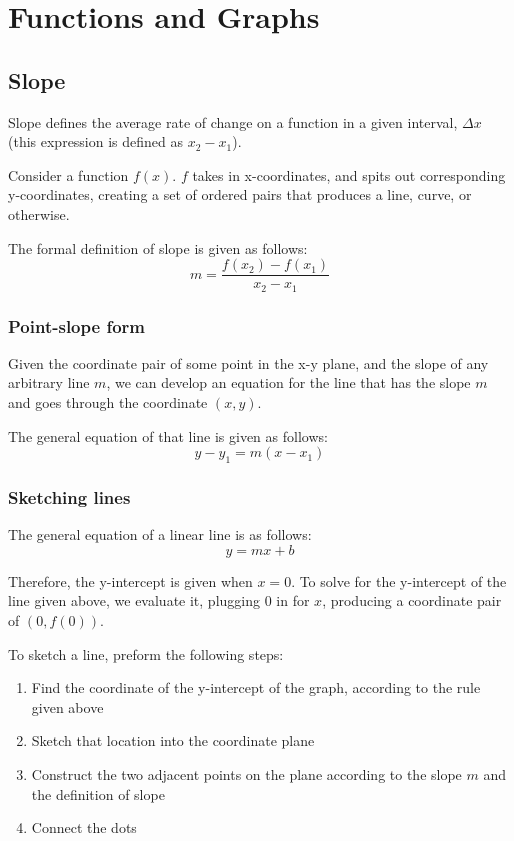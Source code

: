 \chapter{Functions and Graphs}

\section{Slope}
Slope defines the average rate of change on a function in a given interval,
\(\Delta x\) (this expression is defined as $x_2-x_1$).

Consider a function $f(x)$.  $f$ takes in x-coordinates, and spits out
corresponding y-coordinates, creating a set of ordered pairs that produces a
line, curve, or otherwise.

The formal definition of slope is given as follows:
\begin{equation}
m=\frac{f(x_2)-f(x_1)}{x_2-x_1}
\end{equation}

\subsection{Point-slope form}
Given the coordinate pair of some point in the x-y plane, and the slope of any
arbitrary line $m$, we can develop an equation for the line that has the slope
$m$ and goes through the coordinate $(x, y)$.

The general equation of that line is given as follows:
\begin{equation}
y-y_1=m(x-x_1)
\end{equation}

\subsection{Sketching lines}
The general equation of a linear line is as follows:
\begin{equation}
y=mx+b
\end{equation}

Therefore, the y-intercept is given when $x=0$.  To solve for the y-intercept of
the line given above, we evaluate it, plugging $0$ in for $x$, producing a
coordinate pair of $(0, f(0))$.

To sketch a line, preform the following steps:
\begin{enumerate}
\item{Find the coordinate of the y-intercept of the graph, according to the rule
given above}
\item{Sketch that location into the coordinate plane}
\item{Construct the two adjacent points on the plane according to the slope $m$
and the definition of slope}
\item{Connect the dots}
\end{enumerate}

